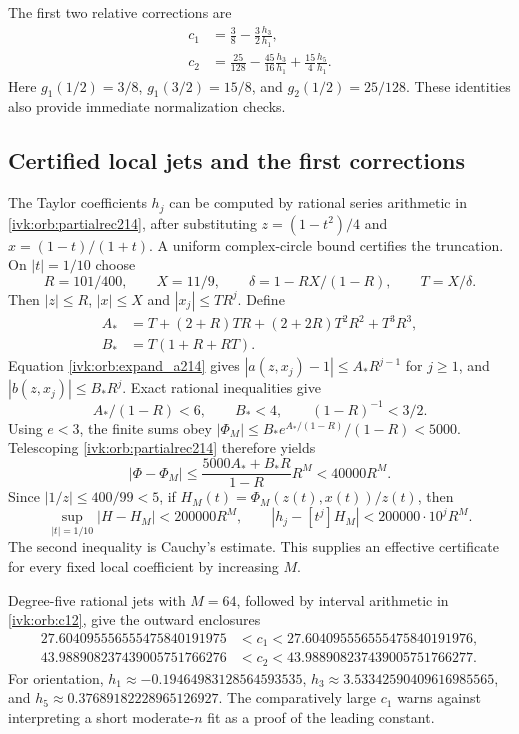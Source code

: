 \documentclass[11pt,letterpaper]{article}
\theoremstyle{remark}\newtheorem{remark}[theorem]{Remark}
\begin{document}
The first two relative corrections are
\begin{equation}\label{ivk:orb:c12}
\begin{aligned}
c_1&=\frac38-\frac32\frac{h_3}{h_1},\\
c_2&=\frac{25}{128}-\frac{45}{16}\frac{h_3}{h_1}
+\frac{15}{4}\frac{h_5}{h_1}.
\end{aligned}
\end{equation}
Here $g_1(1/2)=3/8$, $g_1(3/2)=15/8$, and $g_2(1/2)=25/128$.
These identities also provide immediate normalization checks.

\subsection{Certified local jets and the first corrections}
The Taylor coefficients $h_j$ can be computed by rational series
arithmetic in \eqref{ivk:orb:partialrec214}, after substituting
$z=(1-t^2)/4$ and $x=(1-t)/(1+t)$. A uniform complex-circle bound
certifies the truncation. On $|t|=1/10$ choose
\[
R=101/400,\qquad X=11/9,\qquad
\delta=1-RX/(1-R),\qquad T=X/\delta.
\]
Then $|z|\le R$, $|x|\le X$ and $|x_j|\le TR^j$. Define
\begin{align*}
A_*&=T+(2+R)TR+(2+2R)T^2R^2+T^3R^3,\\
B_*&=T(1+R+RT).
\end{align*}
Equation \eqref{ivk:orb:expand_a214} gives
$|a(z,x_j)-1|\le A_*R^{j-1}$ for $j\ge1$, and
$|b(z,x_j)|\le B_*R^j$. Exact rational inequalities give
\[
A_* /(1-R)<6,\qquad B_*<4,\qquad (1-R)^{-1}<3/2.
\]
Using $e<3$, the finite sums obey
$|\Phi_M|\le B_*e^{A_* /(1-R)}/(1-R)<5000$.
Telescoping \eqref{ivk:orb:partialrec214} therefore yields
\[
|\Phi-\Phi_M|
\le\frac{5000A_*+B_*R}{1-R}R^M<40000R^M.
\]
Since $|1/z|\le400/99<5$, if $H_M(t)=\Phi_M(z(t),x(t))/z(t)$, then
\begin{equation}\label{ivk:orb:Htail}
\sup_{|t|=1/10}|H-H_M|<200000R^M,
\qquad
|h_j-[t^j]H_M|<200000\cdot10^jR^M.
\end{equation}
The second inequality is Cauchy's estimate. This supplies an effective
certificate for every fixed local coefficient by increasing $M$.

Degree-five rational jets with $M=64$, followed by interval arithmetic
in \eqref{ivk:orb:c12}, give the outward enclosures
\begin{equation}\label{ivk:orb:correctiondigits}
\begin{aligned}
27.604095556555475840191975&<c_1<27.604095556555475840191976,\\
43.988908237439005751766276&<c_2<43.988908237439005751766277.
\end{aligned}
\end{equation}
For orientation, $h_1\approx-0.19464983128564593535$,
$h_3\approx3.53342590409616985565$, and
$h_5\approx0.37689182228965126927$.
The comparatively large $c_1$ warns against interpreting a short
moderate-$n$ fit as a proof of the leading constant.
\end{document}
